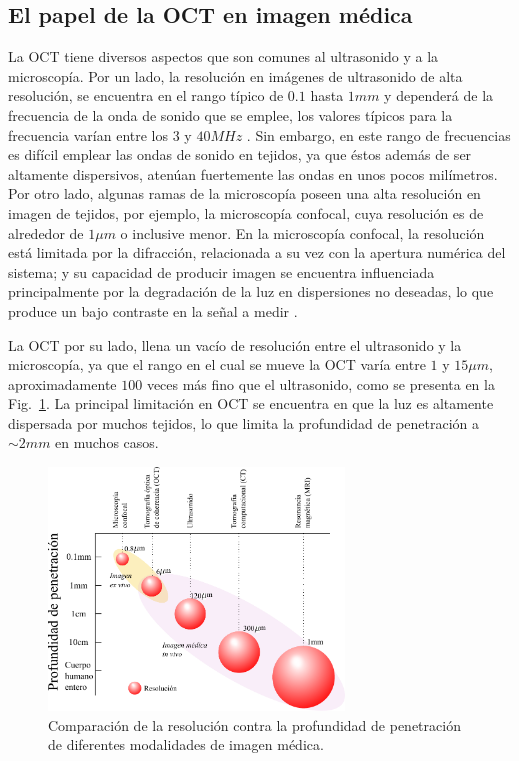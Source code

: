 \subsection{El papel de la OCT en imagen médica}

La OCT tiene diversos aspectos que son comunes al ultrasonido y a la microscopía. Por un lado, la resolución en imágenes de ultrasonido de alta resolución, se encuentra en el rango típico de $0.1$ hasta $1mm$ y dependerá de la frecuencia de la onda de sonido que se emplee, los valores típicos para la frecuencia varían entre los $3$ y $40MHz$ \cite{Szabo}. Sin embargo, en este rango de frecuencias es difícil emplear las ondas de sonido en tejidos, ya que éstos además de ser altamente dispersivos, atenúan fuertemente las ondas en unos pocos milímetros. Por otro lado, algunas ramas de la microscopía poseen una alta resolución en imagen de tejidos, por ejemplo, la microscopía confocal, cuya resolución es de alrededor de $1\mu m$ o inclusive menor. En la microscopía confocal, la resolución está limitada por la difracción, relacionada a su vez con la apertura numérica del sistema; y su capacidad de producir imagen se encuentra influenciada principalmente por la degradación de la luz en dispersiones no deseadas, lo que produce un bajo contraste en la señal a medir \cite{Pawley}. 

La OCT por su lado, llena un vacío de resolución entre el ultrasonido y la microscopía, ya que el rango en el cual se mueve la OCT varía entre $1$ y $15 \mu m$, aproximadamente $100$ veces más fino que el ultrasonido, como se presenta en la Fig.~\ref{fig:OCT_Ultrasound_microscopy}. La principal limitación en OCT se encuentra en que la luz es altamente dispersada por muchos tejidos, lo que limita la profundidad de penetración a $\sim 2mm$ en muchos casos.

\begin{figure}[ht!]
	\centering
	\includegraphics[width = 0.7\textwidth, keepaspectratio]{img/Carlos_oct_resolucion}
	\caption{Comparación de la resolución contra la profundidad de penetración de diferentes modalidades de imagen médica.}
	\label{fig:OCT_Ultrasound_microscopy}
\end{figure}


